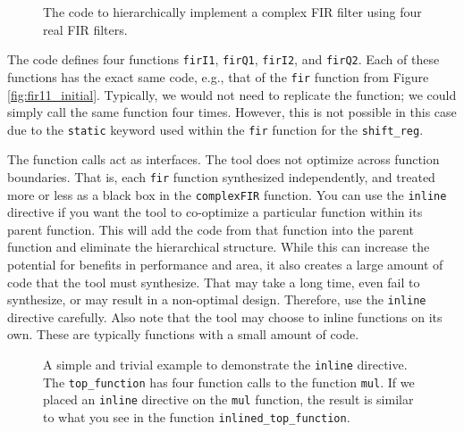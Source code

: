 \begin{figure}

\caption{The \VHLS code to hierarchically implement a complex FIR filter using four real FIR filters.}
\label{fig:complex_fir_code}
\end{figure}

The code defines four functions \lstinline{firI1}, \lstinline{firQ1}, \lstinline{firI2}, and \lstinline{firQ2}. Each of these functions has the exact same code, e.g., that of the \lstinline{fir} function from Figure \ref{fig:fir11_initial}. Typically, we would not need to replicate the function; we could simply call the same function four times. However, this is not possible in this case due to the \lstinline{static} keyword used within the \lstinline{fir} function for the \lstinline{shift_reg}. 

The function calls act as interfaces. The \VHLS tool does not optimize across function boundaries. That is, each \lstinline{fir} function synthesized independently, and treated more or less as a black box in the \lstinline{complexFIR} function. You can use the \lstinline{inline} directive if you want the \VHLS tool to co-optimize a particular function within its parent function. This will add the code from that function into the parent function and eliminate the hierarchical structure. While this can increase the potential for benefits in performance and area, it also creates a large amount of code that the tool must synthesize. That may take a long time, even fail to synthesize, or may result in a non-optimal design. Therefore, use the \lstinline{inline} directive carefully. Also note that the \VHLS tool may choose to inline functions on its own. These are typically functions with a small amount of code.

\begin{figure}

\caption{ A simple and trivial example to demonstrate the \lstinline{inline} directive. The \lstinline{top_function} has four function calls to the function \lstinline{mul}. If we placed an \lstinline{inline} directive on the \lstinline{mul} function, the result is similar to what you see in the function \lstinline{inlined_top_function}. }
\label{fig:inline}
\end{figure}

